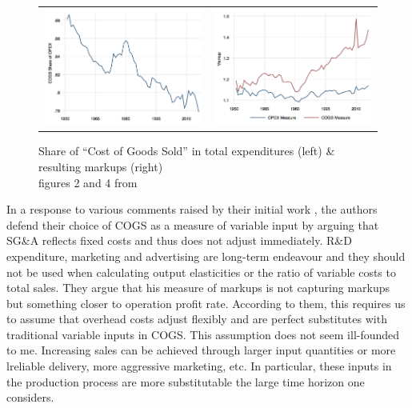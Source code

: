 \documentclass{amsart}
\theoremstyle{definition}
\theoremstyle{remark}
\numberwithin{equation}{section}
\begin{document}
\begin{figure}[h!]
    \begin{tabular}{cc}
        \includegraphics[width=0.48 \textwidth]{shareCOGS.PNG} & \includegraphics[width=0.48 \textwidth]{markups.PNG} \\ 
    \end{tabular}
\caption{Share of ``Cost of Goods Sold'' in total expenditures (left)  \& resulting markups (right) \\ figures 2 and 4 from  \cite{traina2018aggregate}}
\label{fig:traina}
\end{figure}

In a response to various comments raised by their initial work \citep{de2018some}, the authors defend their choice of COGS as a measure of variable input by arguing that SG\&A reflects fixed costs and thus does not adjust immediately. R\&D expenditure, marketing and advertising are long-term endeavour and they should not be used when calculating output elasticities or the ratio of variable costs to total sales. They argue that his measure of markups is not capturing markups but something closer to operation profit rate. According to them, this requires us to assume that overhead costs adjust flexibly and are perfect substitutes with traditional variable inputs in COGS. This assumption does not seem ill-founded to me. Increasing sales can be achieved through larger input quantities or more lreliable delivery, more aggressive marketing, etc. In particular, these inputs in the production process are more substitutable the large time horizon one considers.\\
\end{document}
